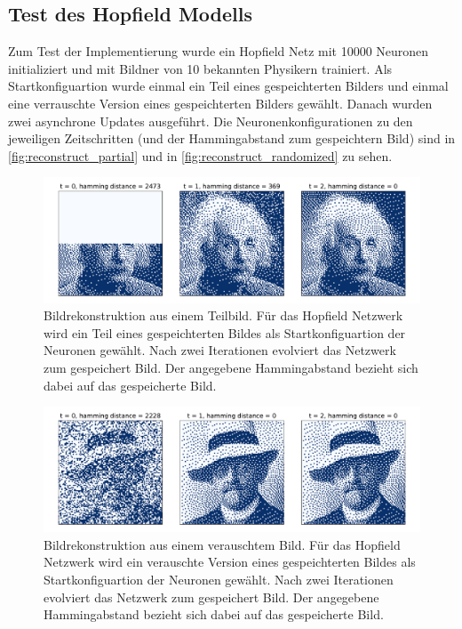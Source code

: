 \subsection{Test des Hopfield Modells}
Zum Test der Implementierung wurde ein Hopfield Netz mit 10000 Neuronen initializiert und mit Bildner von 10 bekannten Physikern trainiert. Als Startkonfiguartion wurde einmal ein Teil eines gespeichterten Bilders und einmal eine verrauschte Version eines gespeichterten Bilders gewählt. Danach wurden zwei asynchrone Updates ausgeführt. Die Neuronenkonfigurationen zu den jeweiligen Zeitschritten (und der Hammingabstand zum gespeichtern Bild) sind in \autoref{fig:reconstruct_partial} und in \autoref{fig:reconstruct_randomized} zu sehen.
\begin{figure}[htp]
	\centering
	\includegraphics[width = \textwidth]{images/reconstruct_einstein.pdf}
	\caption{Bildrekonstruktion aus einem Teilbild. Für das Hopfield Netzwerk wird ein Teil eines gespeichterten Bildes als Startkonfiguartion der Neuronen gewählt. Nach zwei Iterationen evolviert das Netzwerk zum gespeichert Bild. Der angegebene Hammingabstand bezieht sich dabei auf das gespeicherte Bild.}
	\label{fig:reconstruct_partial}
\end{figure}
\begin{figure}[htp]
	\centering
	\includegraphics[width = \textwidth]{images/reconstruct_hilbert.pdf}
	\caption{Bildrekonstruktion aus einem verauschtem Bild. Für das Hopfield Netzwerk wird ein verauschte Version eines gespeichterten Bildes als Startkonfiguartion der Neuronen gewählt. Nach zwei Iterationen evolviert das Netzwerk zum gespeichert Bild. Der angegebene Hammingabstand bezieht sich dabei auf das gespeicherte Bild.}
	\label{fig:reconstruct_randomized}
\end{figure}

